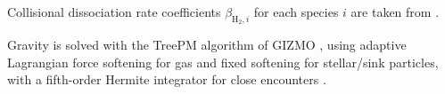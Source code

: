 


Collisional dissociation rate coefficients $\beta_{\mathrm{H_2},i}$
for each species $i$ are taken from \citet{Glover_Abel_2008}.




Gravity is solved with the TreePM algorithm of {\small GIZMO}
\citep{A_new_class_of_Hopkin_2015}, using adaptive Lagrangian
force softening for gas and fixed softening for stellar/sink
particles, with a fifth-order Hermite integrator for close
encounters \citep{FORGE_d_in_FIRE_Hopkin_2023}.


